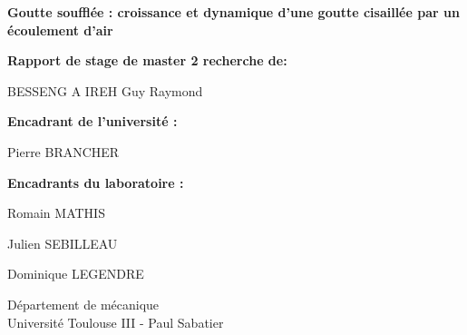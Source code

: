 \begin{titlepage}
    \begin{center}



      \LARGE
      \textbf{Goutte soufflée : croissance et dynamique d'une goutte cisaillée par un écoulement d'air }


        \vspace{1.5cm}
        \textbf{Rapport de stage de master 2 recherche de:}
        
        BESSENG A IREH Guy Raymond

        \vspace{0.8cm}
        \textbf{Encadrant de l'université :}

        Pierre BRANCHER

        \vspace{0.8cm}
        \textbf{Encadrants du laboratoire :}

        Romain MATHIS

        Julien SEBILLEAU

        Dominique LEGENDRE




        \vfill

        
        \Large
        Département de mécanique\\
        Université Toulouse III - Paul Sabatier\\
        \date{}

    \end{center}
\end{titlepage}

